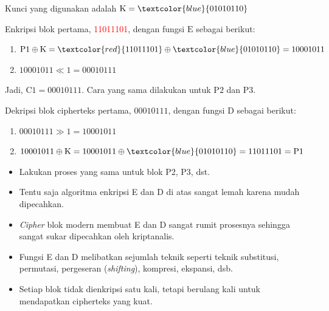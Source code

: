 \documentclass{article}
\begin{document}
\vspace{5mm}

Kunci yang digunakan adalah $\text{K} = \textcolor{blue}{01010110}$

Enkripsi blok pertama, \textcolor{red}{11011101}, dengan fungsi $\text{E}$ sebagai berikut:
\begin{enumerate}
  \item $\text{P1} \oplus \text{K} = \textcolor{red}{11011101} \oplus \textcolor{blue}{01010110} = 10001011$
  \item $10001011 \ll 1 = 00010111$
\end{enumerate}

Jadi, $\text{C1} = 00010111$. Cara yang sama dilakukan untuk $\text{P2}$ dan $\text{P3}$.

Dekripsi blok cipherteks pertama, $00010111$, dengan fungsi $\text{D}$ sebagai berikut:
\begin{enumerate}
  \item $00010111 \gg 1 = 10001011$
  \item $10001011 \oplus \text{K} = 10001011 \oplus \textcolor{blue}{01010110} = 11011101 = \text{P1}$
\end{enumerate}

\newpage


\begin{itemize}
    \item Lakukan proses yang sama untuk blok P2, P3, dst.
    \item Tentu saja algoritma enkripsi E dan D di atas sangat lemah karena mudah dipecahkan.
    \item \textit{Cipher} blok modern membuat E dan D sangat rumit prosesnya sehingga sangat sukar dipecahkan oleh kriptanalis.
    \item Fungsi E dan D melibatkan sejumlah teknik seperti teknik substitusi, permutasi, pergeseran (\textit{shifting}), kompresi, ekspansi, dsb.
    \item Setiap blok tidak dienkripsi satu kali, tetapi berulang kali untuk mendapatkan cipherteks yang kuat.
\end{itemize}

\newpage

\end{document}
